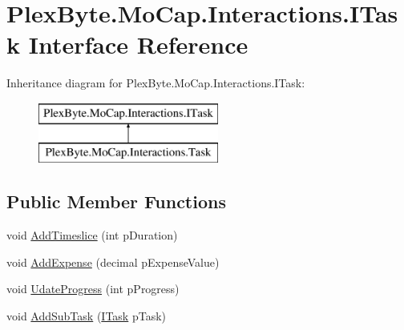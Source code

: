\hypertarget{interface_plex_byte_1_1_mo_cap_1_1_interactions_1_1_i_task}{}\section{Plex\+Byte.\+Mo\+Cap.\+Interactions.\+I\+Task Interface Reference}
\label{interface_plex_byte_1_1_mo_cap_1_1_interactions_1_1_i_task}
Inheritance diagram for Plex\+Byte.\+Mo\+Cap.\+Interactions.\+I\+Task\+:\begin{figure}[H]
\begin{center}
\leavevmode
\includegraphics[height=2.000000cm]{interface_plex_byte_1_1_mo_cap_1_1_interactions_1_1_i_task}
\end{center}
\end{figure}
\subsection*{Public Member Functions}
\begin{DoxyCompactItemize}
\item 
void \hyperlink{interface_plex_byte_1_1_mo_cap_1_1_interactions_1_1_i_task_af70a3a36f24fedda95ad55714333090f}{Add\+Timeslice} (int p\+Duration)
\item 
void \hyperlink{interface_plex_byte_1_1_mo_cap_1_1_interactions_1_1_i_task_a96b54ce198b08eccb95456e16c4538d5}{Add\+Expense} (decimal p\+Expense\+Value)
\item 
void \hyperlink{interface_plex_byte_1_1_mo_cap_1_1_interactions_1_1_i_task_a7e385a390973b7cc165bfbb6caf9ed75}{Udate\+Progress} (int p\+Progress)
\item 
void \hyperlink{interface_plex_byte_1_1_mo_cap_1_1_interactions_1_1_i_task_a20a23d8d8abb9f14330e75e8e09fe263}{Add\+Sub\+Task} (\hyperlink{interface_plex_byte_1_1_mo_cap_1_1_interactions_1_1_i_task}{I\+Task} p\+Task)
\end{DoxyCompactItemize}
